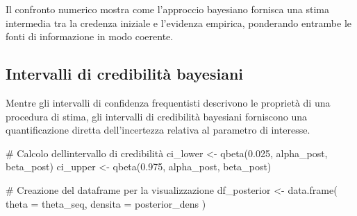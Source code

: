 \documentclass[
  letterpaper,
  DIV=11,
  numbers=noendperiod,
  oneside]{scrreprt}
\newenvironment{Shaded}{\begin{snugshade}}{\end{snugshade}}
\newcommand{\AttributeTok}[1]{\textcolor[rgb]{0.40,0.45,0.13}{#1}}
\newcommand{\CommentTok}[1]{\textcolor[rgb]{0.37,0.37,0.37}{#1}}
\newcommand{\FloatTok}[1]{\textcolor[rgb]{0.68,0.00,0.00}{#1}}
\newcommand{\FunctionTok}[1]{\textcolor[rgb]{0.28,0.35,0.67}{#1}}
\newcommand{\NormalTok}[1]{\textcolor[rgb]{0.00,0.23,0.31}{#1}}
\newcommand{\OtherTok}[1]{\textcolor[rgb]{0.00,0.23,0.31}{#1}}
\theoremstyle{definition}
\theoremstyle{plain}
\theoremstyle{definition}
\theoremstyle{remark}
\begin{document}
Il confronto numerico mostra come l'approccio bayesiano fornisca una
stima intermedia tra la credenza iniziale e l'evidenza empirica,
ponderando entrambe le fonti di informazione in modo coerente.

\subsection{Intervalli di credibilità
bayesiani}\label{intervalli-di-credibilituxe0-bayesiani}

Mentre gli intervalli di confidenza frequentisti descrivono le proprietà
di una procedura di stima, gli intervalli di credibilità bayesiani
forniscono una quantificazione diretta dell'incertezza relativa al
parametro di interesse.

\begin{Shaded}
\begin{Highlighting}[]
\CommentTok{\# Calcolo dell\textquotesingle{}intervallo di credibilità}
\NormalTok{ci\_lower }\OtherTok{\textless{}{-}} \FunctionTok{qbeta}\NormalTok{(}\FloatTok{0.025}\NormalTok{, alpha\_post, beta\_post)}
\NormalTok{ci\_upper }\OtherTok{\textless{}{-}} \FunctionTok{qbeta}\NormalTok{(}\FloatTok{0.975}\NormalTok{, alpha\_post, beta\_post)}

\CommentTok{\# Creazione del dataframe per la visualizzazione}
\NormalTok{df\_posterior }\OtherTok{\textless{}{-}} \FunctionTok{data.frame}\NormalTok{(}
  \AttributeTok{theta =}\NormalTok{ theta\_seq,}
  \AttributeTok{densita =}\NormalTok{ posterior\_dens}
\NormalTok{)}


\end{Highlighting}
\end{Shaded}
\end{document}
